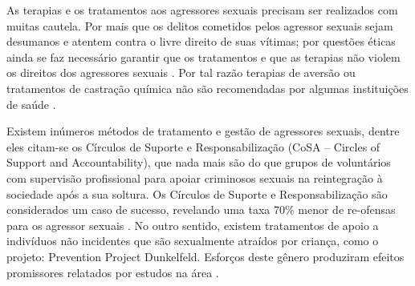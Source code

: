 As terapias e os tratamentos aos agressores sexuais precisam ser realizados com muitas cautela. Por mais que os delitos cometidos pelos agressor sexuais sejam desumanos e atentem contra o livre direito de suas vítimas; por questões éticas ainda se faz necessário garantir que os tratamentos e que as terapias não violem os direitos dos agressores sexuais \cite{finkelhor2009prevention}. Por tal razão terapias de aversão ou tratamentos de castração química não são recomendadas por algumas instituições de saúde \cite{maia2014castraccao}.




Existem inúmeros métodos de tratamento e gestão de agressores sexuais, dentre eles citam-se os Círculos de Suporte e Responsabilização (CoSA – Circles of Support and Accountability), que nada mais são do que grupos de voluntários com supervisão profissional para apoiar criminosos sexuais na reintegração à sociedade após a sua soltura. Os Círculos de Suporte e Responsabilização são considerados um caso de sucesso, revelando uma taxa 70\% menor de re-ofensas para os agressor sexuais \cite{finkelhor2009prevention}. No outro sentido, existem tratamentos de apoio a indivíduos não incidentes que são sexualmente atraídos por criança, como o projeto: Prevention Project Dunkelfeld. Esforços deste gênero produziram efeitos promissores relatados por estudos na área \cite{mendelson2015parent}.


